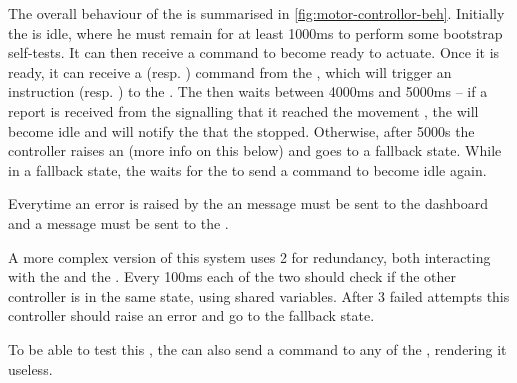 \documentclass[11pt]{article}
\begin{document}
The overall behaviour of the  is summarised in \cref{fig:motor-controllor-beh}.
Initially the  is idle, where he must remain for at least 1000ms to perform some bootstrap self-tests. It can then receive a  command to become ready to actuate.
Once it is ready, it can receive a  (resp. ) command from the , which will trigger an instruction  (resp. ) to the .
The  then waits between 4000ms and 5000ms -- if a report is received from the  signalling that it reached the movement , the  will become idle and will notify the  that the  stopped. Otherwise, after 5000s the controller raises an  (more info on this below) and goes to a fallback state.
While in a fallback state, the  waits for the  to send a  command to become idle again.


Everytime an error is raised by the 
an  message must be sent to the dashboard and
a  message must be sent to the .

A more complex version of this system uses 2  for redundancy, both interacting with the  and the .
Every 100ms each of the two  should check if the other controller is in the same state, using shared variables. After 3 failed attempts this controller should raise an error and go to the fallback state.

To be able to test this , the  can also send a  command to any of the , rendering it useless.
\end{document}
